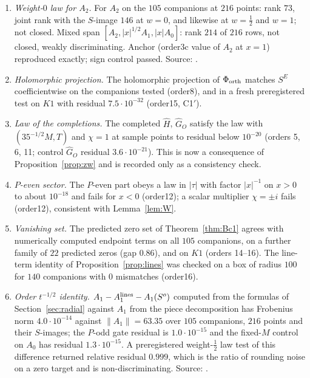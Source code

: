\begin{enumerate}[label=D.\arabic*,leftmargin=3em]
\item\label{catB:4b} \emph{Weight-$0$ law for $A_2$.} For $A_2$ on the $105$ companions at $216$ points: rank $73$, joint rank with the $S$-image $146$ at $w=0$,
and likewise at $w=\frac12$ and $w=1$; not closed. Mixed span $[A_2,|x|^{1/2}A_1,|x|A_0]$: rank $214$ of $216$ rows, not closed, weakly
discriminating. Anchor (order3c value of $A_2$ at $x=1$) reproduced exactly; sign control passed. Source: .
\item\label{catB:sh1} \emph{Holomorphic projection.} The holomorphic projection of $\Phi_{\rm orth}$ matches $S^E$ coefficientwise on the companions tested (order8), and in a
fresh preregistered test on $K1$ with residual $7.5\cdot10^{-32}$ (order15, C1$'$).
\item\label{catB:sh2} \emph{Law of the completions.} The completed $\widehat H$, $\widehat G_O$ satisfy the law with $(35^{-1/2}M,T)$ and $\chi=1$ at sample points to residual
below $10^{-20}$ (orders 5, 6, 11; control $\widehat G_O$ residual $3.6\cdot10^{-21}$). This is now a consequence of Proposition~\ref{prop:zw} and is recorded only as a consistency check.
\item\label{catB:sh3} \emph{$P$-even sector.} The $P$-even part obeys a law in $|\tau|$ with factor $|x|^{-1}$ on $x>0$ to about $10^{-18}$ and fails for $x<0$ (order12); a
scalar multiplier $\chi=\pm i$ fails (order12), consistent with Lemma~\ref{lem:W}.
\item\label{catB:sh4} \emph{Vanishing set.} The predicted zero set of Theorem~\ref{thm:Bc1} agrees with numerically computed endpoint terms on all $105$ companions, on a further
family of $22$ predicted zeros (gap $0.86$), and on $K1$ (orders 14--16). The line-term identity of Proposition~\ref{prop:lines} was checked on a box of radius $100$ for
$140$ companions with $0$ mismatches (order16).
\item\label{catB:sh5} \emph{Order $t^{-1/2}$ identity.} $A_1-A_1^{\rm lines}-A_1(S^o)$ computed from the formulas of Section~\ref{sec:radial} against $A_1$ from the piece decomposition
has Frobenius norm $4.0\cdot10^{-14}$ against $\|A_1\|=63.35$ over $105$ companions, $216$ points and their $S$-images; the $P$-odd gate residual is $1.0\cdot10^{-15}$ and the fixed-$M$
control on $A_0$ has residual $1.3\cdot10^{-15}$. A preregistered weight-$\frac12$ law test of this difference returned relative residual $0.999$, which is the ratio of rounding
noise on a zero target and is non-discriminating. Source: .
\end{enumerate}
